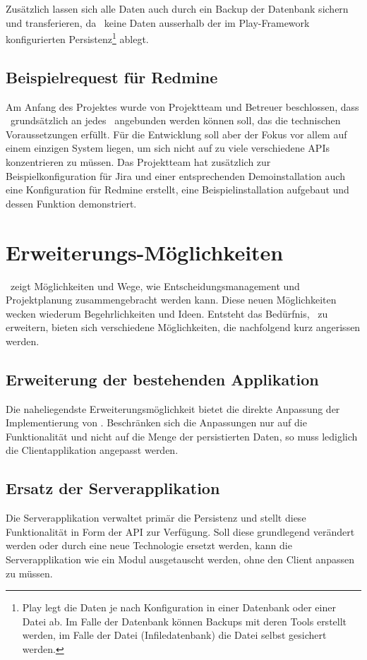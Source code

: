 			Zusätzlich lassen sich alle Daten auch durch ein Backup der Datenbank sichern und transferieren, da \eeppi\ keine Daten ausserhalb der im Play-Framework konfigurierten Persistenz\footnote{Play legt die Daten je nach Konfiguration in einer Datenbank oder einer Datei ab. Im Falle der Datenbank können Backups mit deren Tools erstellt werden, im Falle der Datei (Infiledatenbank) die Datei selbst gesichert werden.} ablegt.
			
			
		\subsection{Beispielrequest für Redmine}
			Am Anfang des Projektes wurde von Projektteam und Betreuer beschlossen, 
			dass \eeppi\ grundsätzlich an jedes \ppt\ angebunden werden können soll, das die technischen Voraussetzungen erfüllt.
			Für die Entwicklung soll aber der Fokus vor allem auf einem einzigen System liegen, um sich nicht auf zu viele verschiedene APIs konzentrieren zu müssen.
			Das Projektteam hat zusätzlich zur Beispielkonfiguration für Jira und einer entsprechenden Demoinstallation auch eine Konfiguration für Redmine erstellt, eine Beispielinstallation aufgebaut und dessen Funktion demonstriert.
	
	
	\section{Erweiterungs-Möglichkeiten}
		\eeppi\ zeigt Möglichkeiten und Wege, wie Entscheidungsmanagement und Projektplanung zusammengebracht werden kann.
		Diese neuen Möglichkeiten wecken wiederum Begehrlichkeiten und Ideen.
		Entsteht das Bedürfnis, \eeppi\ zu erweitern, bieten sich verschiedene Möglichkeiten, die nachfolgend kurz angerissen werden.
		

		\subsection{Erweiterung der bestehenden Applikation}
			Die naheliegendste Erweiterungsmöglichkeit bietet die direkte Anpassung der Implementierung von \eeppi.
			Beschränken sich die Anpassungen nur auf die Funktionalität und nicht auf die Menge der persistierten Daten, so muss lediglich die Clientapplikation angepasst werden.
	
		\subsection{Ersatz der Serverapplikation}
			Die Serverapplikation verwaltet primär die Persistenz und stellt diese Funktionalität in Form der API zur Verfügung.
			Soll diese grundlegend verändert werden oder durch eine neue Technologie ersetzt werden,
			kann die Serverapplikation wie ein Modul ausgetauscht werden, ohne den Client anpassen zu müssen.
			
